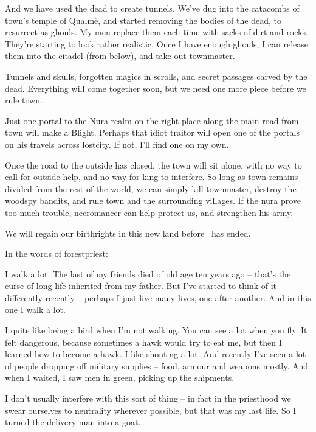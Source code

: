 \begin{multicols}{2}
\begin{exampletext}
  And we have used the dead to create tunnels.
  We've dug into the catacombs of \gls{town}'s temple of Qualm\"{e}, and started removing the bodies of the dead, to resurrect as ghouls.
  My men replace them each time with sacks of dirt and rocks.
  They're starting to look rather realistic.
  Once I have enough ghouls, I can release them into the citadel (from below), and take out \gls{townmaster}.

  Tunnels and skulls, forgotten magics in scrolls, and secret passages carved by the dead.
  Everything will come together soon, but we need one more piece before we rule \gls{town}.

  Just one portal to the Nura realm on the right place along the main road from \gls{town} will make a Blight.
  Perhaps that idiot \gls{traitor} will open one of the portals on his travels across \gls{lostcity}.
  If not, I'll find one on my own.

  Once the road to the outside has closed, the \gls{town} will sit alone, with no way to call for outside help, and no way for \gls{king} to interfere.
  So long as \gls{town} remains divided from the rest of the world, we can simply kill \gls{townmaster}, destroy the woodspy bandits, and rule \gls{town} and the surrounding villages.
  If the nura prove too much trouble, \gls{necromancer} can help protect us, and strengthen his army.

  We will regain our birthrights in this new land before \season\ has ended.

\end{exampletext}

In the words of \gls{forestpriest}:

\begin{exampletext}

  I walk a lot.
  The last of my friends died of old age ten years ago -- that's the curse of long life inherited from my father.
  But I've started to think of it differently recently -- perhaps I just live many lives, one after another.
  And in this one I walk a lot.

  I quite like being a bird when I'm not walking.
  You can see a lot when you fly.
  It felt dangerous, because sometimes a hawk would try to eat me, but then I learned how to become a hawk.
  I like shouting a lot.
  And recently I've seen a lot of people dropping off military supplies -- food, armour and weapons mostly.
  And when I waited, I saw men in green, picking up the shipments.
  
  I don't usually interfere with this sort of thing -- in fact in the priesthood we swear ourselves to neutrality wherever possible, but that was my last life.
  So I turned the delivery man into a goat.


\end{exampletext}
\end{multicols}
